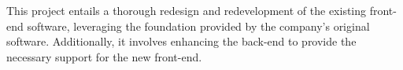 



This project entails a thorough redesign and redevelopment of the existing front-end software, 
leveraging the foundation provided by the company's original software. 
Additionally, it involves enhancing the back-end to provide the necessary support 
for the new front-end.